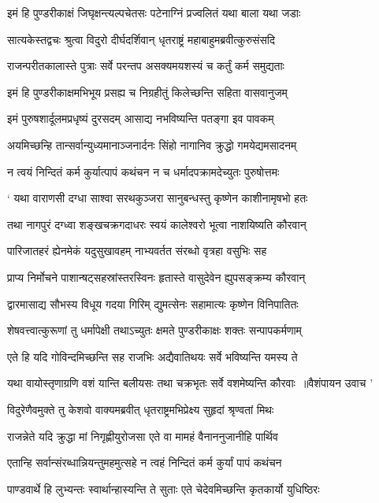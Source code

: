 \twolineshloka
{इमं हि पुण्डरीकाक्षं जिघृक्षन्त्यल्पचेतसः}
{पटेनाग्निं प्रज्वलितं यथा बाला यथा जडाः}


\twolineshloka
{सात्यकेस्तद्वचः श्रुत्वा विदुरो दीर्घदर्शिवान्}
{धृतराष्ट्रं महाबाहुमब्रवीत्कुरुसंसदि}


\twolineshloka
{राजन्परीतकालास्ते पुत्राः सर्वे परन्तप}
{असक्यमयशस्यं च कर्तुं कर्म समुद्यताः}


\twolineshloka
{इमं हि पुण्डरीकाक्षमभिभूय प्रसह्य च}
{निग्रहीतुं किलेच्छन्ति सहिता वासवानुजम्}


\twolineshloka
{इमं पुरुषशार्दूलमप्रधृष्यं दुरसदम्}
{आसाद्य नभविष्यन्ति पतङ्गा इव पावकम्}


\twolineshloka
{अयमिच्छन्हि तान्सर्वान्युध्यमानाञ्जनार्दनः}
{सिंहो नागानिव क्रुद्धो गमयेद्यमसादनम्}


\twolineshloka
{न त्वयं निन्दितं कर्म कुर्यात्पापं कथंचन}
{न च धर्मादपक्रामदेच्युतः पुरुषोत्तमः}


\twolineshloka
{` यथा वाराणसी दग्धा साश्वा सरथकुञ्जरा}
{सानुबन्धस्तु कृष्णेन काशीनामृषभो हतः}


\twolineshloka
{तथा नागपुरं दग्ध्वा शङ्खचक्रगदाधरः}
{स्वयं कालेश्वरो भूत्वा नाशयिष्यति कौरवान्}


\twolineshloka
{पारिजातहरं ह्येनमेकं यदुसुखावहम्}
{नाभ्यवर्तत संरब्धो वृत्रहा वसुभिः सह}


\twolineshloka
{प्राप्य निर्मोचने पाशान्षट्सहस्रांस्तरस्विनः}
{हृतास्ते वासुदेवेन ह्युपसङ्क्रम्य कौरवान्}


\twolineshloka
{द्वारमासाद्य सौभस्य विधूय गदया गिरिम्}
{द्युमत्सेनः सहामात्यः कृष्णेन विनिपातितः}


\twolineshloka
{शेषवत्त्वात्कुरूणां तु धर्मापेक्षी तथाऽच्युतः}
{क्षमते पुण्डरीकाक्षः शक्तः सन्पापकर्मणाम्}


\twolineshloka
{एते हि यदि गोविन्दमिच्छन्ति सह राजभिः}
{अद्यैवातिथयः सर्वे भविष्यन्ति यमस्य ते}


\threelineshloka
{यथा वायोस्तृणाग्रणि वशं यान्ति बलीयसः}
{तथा चक्रभृतः सर्वे वशमेष्यन्ति कौरवाः ॥वैशंपायन उवाच}
{'}


\twolineshloka
{विदुरेणैवमुक्ते तु केशवो वाक्यमब्रवीत्}
{धृतराष्ट्रमभिप्रेक्ष्य सुहृदां श्रृण्वतां मिथः}


\twolineshloka
{राजन्नेते यदि क्रुद्धा मां निगृह्णीयुरोजसा}
{एते वा मामहं वैनाननुजानीहि पार्थिव}


\twolineshloka
{एतान्हि सर्वान्संरब्धान्नियन्तुमहमुत्सहे}
{न त्वहं निन्दितं कर्म कुर्यां पापं कथंचन}


\twolineshloka
{पाण्डवार्थे हि लुभ्यन्तः स्वार्थान्हास्यन्ति ते सुताः}
{एते चेदेवमिच्छन्ति कृतकार्यो युधिष्ठिरः}


